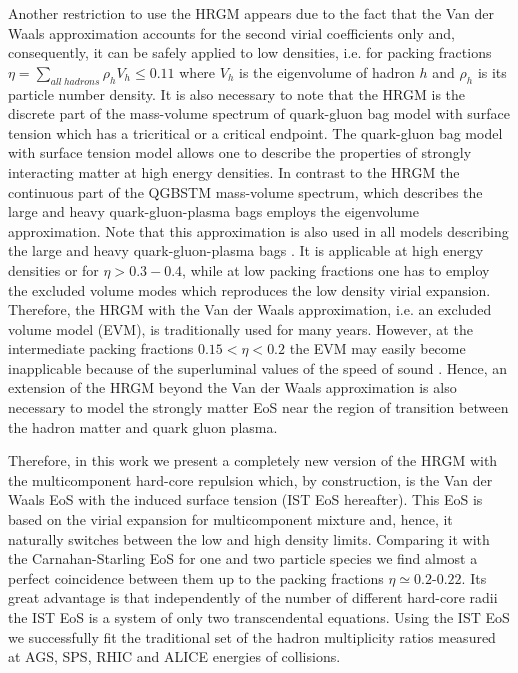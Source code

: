 \documentclass[12pt]{article}
\begin{document}
Another restriction to use the HRGM appears due to the fact that the Van der Waals approximation accounts for the second virial coefficients only and, consequently,  it  can be safely  applied  to low densities, i.e. for packing fractions $\eta = \sum\limits_{all~hadrons} \rho_h  V_h \le 0.11$ \cite{SSpeed} where $V_h$ is the eigenvolume of hadron $h$ and $\rho_h$ is its particle number density. It is also necessary to note  that  the HRGM is the discrete part of the mass-volume spectrum of  quark-gluon bag model with surface tension which has a tricritical \cite{QGBST3crit} or a critical 
\cite{QGBSTcrit} endpoint.  The quark-gluon bag model with surface tension model  allows one to describe the properties of strongly interacting matter at high energy densities. In contrast to the HRGM the continuous part of the QGBSTM  mass-volume spectrum, which describes the large and heavy  quark-gluon-plasma bags employs  the eigenvolume approximation. 
Note that  this  approximation is also used  in all models  describing the  large and heavy  quark-gluon-plasma bags
\cite{QGBST3crit,QGBSTcrit,Carsten07,Carsten08,Ferroni,Carsten10,IvanytskyiNPA,IvanytskyiPRE,UJP2012}.  
It is applicable at high energy densities or  for $\eta > 0.3-0.4$, while at low packing fractions one has to employ the excluded volume modes which reproduces  the low density virial expansion. Therefore, the HRGM with the Van der Waals approximation, i.e. an excluded volume model  (EVM),  is traditionally used for many years. 
However, at the intermediate packing fractions $0.15 < \eta < 0.2$ the EVM  
may easily  become  inapplicable because of the  superluminal values of the speed of sound \cite{SSpeed,Bugaev:2016,Vovch15}.  Hence, 
 an extension of the HRGM beyond the Van der Waals approximation  is also   necessary to model
 the strongly matter EoS near the region of transition between the hadron matter and  quark gluon plasma.  


Therefore, in this work we present a completely new version of the HRGM with the multicomponent hard-core repulsion which, by construction,  is the Van der Waals EoS with the induced surface tension (IST EoS hereafter).  This EoS is based on the virial expansion for multicomponent mixture  and, hence,  it naturally switches between the low and high density limits. Comparing it with the Carnahan-Starling EoS \cite{CSeos} for one and two particle species we find almost a perfect coincidence between them up to the packing fractions $\eta \simeq 0.2$-$0.22$. 
Its great advantage is that independently of the number of  different hard-core radii  the IST EoS  is a system of only two transcendental equations.  
Using the IST EoS we successfully  fit the traditional set of the hadron multiplicity ratios \cite{Horn,SFO,Veta14} measured 
at AGS, SPS,  RHIC and ALICE energies of collisions. 
\end{document}
